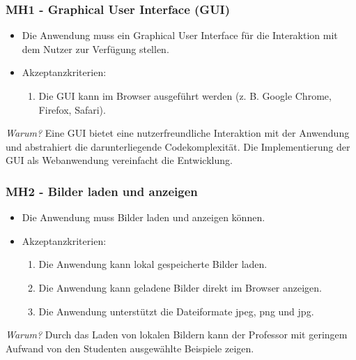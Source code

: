 \subsubsection{MH1 - Graphical User Interface (GUI)}

\begin{itemize}
    \item Die Anwendung muss ein Graphical User Interface für die Interaktion mit dem Nutzer zur Verfügung stellen.
    \item Akzeptanzkriterien:
    \begin{enumerate}
        \item Die GUI kann im Browser ausgeführt werden (z. B. Google Chrome, Firefox, Safari).
    \end{enumerate}
\end{itemize}
\textit{Warum?} Eine GUI bietet eine nutzerfreundliche Interaktion mit der Anwendung und abstrahiert die darunterliegende Codekomplexität.
Die Implementierung der GUI als Webanwendung vereinfacht die Entwicklung.

\subsubsection{MH2 - Bilder laden und anzeigen}

\begin{itemize}
    \item Die Anwendung muss Bilder laden und anzeigen können.
    \item Akzeptanzkriterien:
    \begin{enumerate}
        \item Die Anwendung kann lokal gespeicherte Bilder laden.
        \item Die Anwendung kann geladene Bilder direkt im Browser anzeigen.
        \item Die Anwendung unterstützt die Dateiformate jpeg, png und jpg.
    \end{enumerate}
\end{itemize}
\textit{Warum?} Durch das Laden von lokalen Bildern kann der Professor mit geringem Aufwand von den Studenten ausgewählte Beispiele zeigen.

